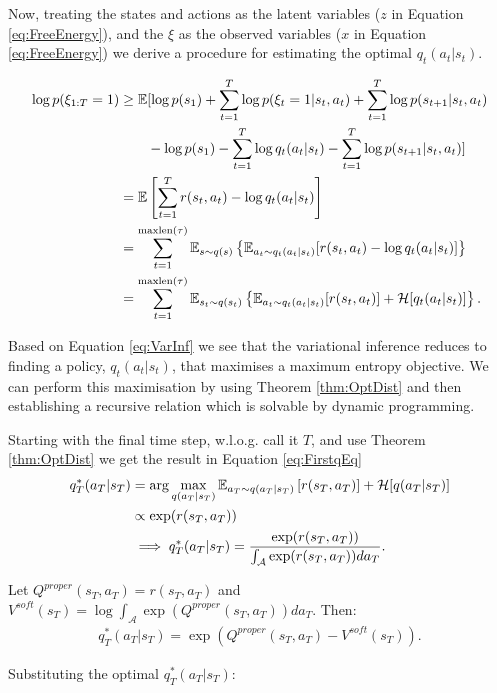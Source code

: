 \documentclass{report}
\numberwithin{equation}{section}
\numberwithin{figure}{section}
\numberwithin{table}{section}
\numberwithin{algorithm}{section}
\begin{document}
Now, treating the states and actions as the latent variables
($z$ in Equation \ref{eq:FreeEnergy}), 
and the $\xi$ as the observed variables ($x$ in Equation \ref{eq:FreeEnergy})
we derive a procedure for estimating the optimal $q_t(a_t|s_t)$.

\begin{align}\label{eq:VarInf}
  \log p(\xi_{1:T}=1)&\ge \mathbb{E}[
    \log p(s_1) + \sum_{t=1}^T \log p(\xi_t=1|s_t,a_t) + \sum_{t=1}^T \log p(s_{t+1}|s_t,a_t)\\
    & \qquad -\log p(s_1) - \sum_{t=1}^T \log q_t(a_t|s_t) -  \sum_{t=1}^T \log p(s_{t+1}|s_t,a_t)
  ]\notag\\
&=\mathbb{E}\left[
  \sum_{t=1}^T r(s_t,a_t) - \log q_t(a_t|s_t)
\right]\notag\\
&=\sum_{t=1}^{\text{maxlen}(\tau)} \mathbb{E}_{s\sim q(s)}\left\{
  \mathbb{E}_{a_t\sim q_t(a_t|s_t)}[r(s_t,a_t) - \log q_t(a_t|s_t)]\right\}\notag\\
&=\sum_{t=1}^{\text{maxlen}(\tau)} \mathbb{E}_{s_t\sim q(s_t)}\left\{
  \mathbb{E}_{a_t\sim q_t(a_t|s_t)}[r(s_t,a_t)] + \mathcal{H}[q_t(a_t|s_t)]\right\}.
\end{align}

Based on Equation \ref{eq:VarInf} we see that the variational inference 
reduces to finding a policy, $q_t(a_t|s_t)$, that maximises a maximum 
entropy objective. We can perform this maximisation by using 
Theorem \ref{thm:OptDist} and then establishing a recursive 
relation which is solvable by dynamic programming.

Starting with the final time step, w.l.o.g. call it $T$, and 
use Theorem \ref{thm:OptDist} we get the result in Equation 
\ref{eq:FirstqEq}
\begin{align}\label{eq:FirstqEq}
  q_T^*(a_T|s_T)&=\arg \max_{q(a_T|s_T)} \mathbb{E}_{a_T\sim q(a_T|s_T)}\left[
    r(s_T, a_T)
  \right] + \mathcal{H}[q(a_T|s_T)]\notag\\
  &\propto \exp(r(s_T,a_T))\notag\\
  &\implies q_T^*(a_T|s_T)=\frac{\exp(r(s_T,a_T))}{\int_{\mathcal{A}}\exp(r(s_T,a_T))da_T}.
\end{align}

Let $Q^{proper}(s_T,a_T)=r(s_T,a_T)$ and 
$V^{soft}(s_T)=\log\int_{\mathcal{A}}\exp(Q^{proper}(s_T,a_T))da_T$. 
Then: 
\begin{eqnarray*}
  q_T^*(a_T|s_T)=\exp(Q^{proper}(s_T,a_T)-V^{soft}(s_T)). 
\end{eqnarray*}

Substituting the optimal $q^*_T(a_T|s_T)$:
\end{document}
